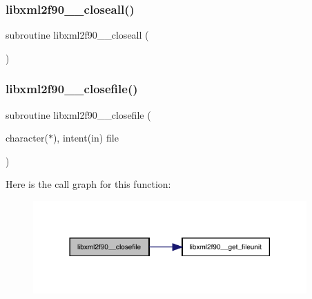 \subsubsection{\texorpdfstring{libxml2f90\+\_\+\+\_\+closeall()}{libxml2f90\_\_closeall()}}
{\footnotesize\ttfamily subroutine libxml2f90\+\_\+\+\_\+closeall (\begin{DoxyParamCaption}{ }\end{DoxyParamCaption})}

\mbox{\label{libxml2f90_8f90__pp_8f90_a33bae24588e3ae2ed3a7f9756c6845f0}} 
\subsubsection{\texorpdfstring{libxml2f90\+\_\+\+\_\+closefile()}{libxml2f90\_\_closefile()}}
{\footnotesize\ttfamily subroutine libxml2f90\+\_\+\+\_\+closefile (\begin{DoxyParamCaption}\item[{character($\ast$), intent(in)}]{file }\end{DoxyParamCaption})}

Here is the call graph for this function\+:
\nopagebreak
\begin{figure}[H]
\begin{center}
\leavevmode
\includegraphics[width=297pt]{libxml2f90_8f90__pp_8f90_a33bae24588e3ae2ed3a7f9756c6845f0_cgraph}
\end{center}
\end{figure}
\mbox{\label{libxml2f90_8f90__pp_8f90_aa7cbdbfe67d0ec6b1ce87ce016b6cb22}} 
